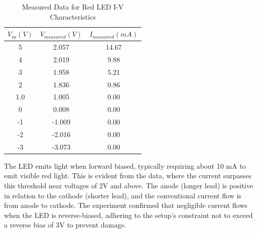 \documentclass[12pt]{article}
\begin{document}
\begin{table}[H]
	\centering
	\begin{tabular}{|c|c|c|}
		\hline
		\textbf{\(V_{in} (V)\)} & \textbf{\(V_{measured} (V)\)} & \textbf{\(I_{measured} (mA)\)} \\
		\hline
		5                       & 2.057                         & 14.67                          \\
		4                       & 2.019                         & 9.88                           \\
		3                       & 1.958                         & 5.21                           \\
		2                       & 1.836                         & 0.86                           \\
		1.0                     & 1.005                         & 0.00                           \\
		0                       & 0.008                         & 0.00                           \\
		-1                      & -1.009                        & 0.00                           \\
		-2                      & -2.016                        & 0.00                           \\
		-3                      & -3.073                        & 0.00                           \\
		\hline
	\end{tabular}
	\caption{Measured Data for Red LED I-V Characteristics}
	\label{tab:led_data}
\end{table}
The LED emits light when forward biased, typically requiring about 10 mA to emit visible red light. This is evident from the data, where the current surpasses this threshold near voltages of 2V and above. The anode (longer lead) is positive in relation to the cathode (shorter lead), and the conventional current flow is from anode to cathode. The experiment confirmed that negligible current flows when the LED is reverse-biased, adhering to the setup's constraint not to exceed a reverse bias of 3V to prevent damage.
\end{document}
